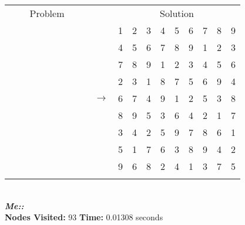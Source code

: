 \documentclass{article}
\begin{document}
\begin{tabular}{||c|c|c||c|c|c||c|c|c|| c ||c|c|c||c|c|c||c|c|c||}
  \cmidrule{1-9} \cmidrule{11-19}
  \multicolumn{9}{|c|}{Problem} &                   & \multicolumn{9}{|c|}{Solution}   \\\cmidrule{1-9} \cmidrule{11-19} \morecmidrules \cmidrule{1-9} \cmidrule{11-19}
  &   &   &   &   &   &   &   &   &  & 1 & 2 & 3 & 4 & 5 & 6 & 7 & 8 & 9\\\cmidrule{1-9} \cmidrule{11-19}
  &   &   &   &   &   &   &   &   &  & 4 & 5 & 6 & 7 & 8 & 9 & 1 & 2 & 3\\\cmidrule{1-9} \cmidrule{11-19}
  &   &   &   &   &   &   &   &   &  & 7 & 8 & 9 & 1 & 2 & 3 & 4 & 5 & 6\\\cmidrule{1-9} \cmidrule{11-19} \morecmidrules \cmidrule{1-9} \cmidrule{11-19}
  &   &   &   &   &   &   &   &   &  & 2 & 3 & 1 & 8 & 7 & 5 & 6 & 9 & 4\\\cmidrule{1-9} \cmidrule{11-19}
  &   &   &   &   &   &   &   &   & $\rightarrow$ & 6 & 7 & 4 & 9 & 1 & 2 & 5 & 3 & 8\\\cmidrule{1-9} \cmidrule{11-19}
  &   &   &   &   &   &   &   &   &  & 8 & 9 & 5 & 3 & 6 & 4 & 2 & 1 & 7\\\cmidrule{1-9} \cmidrule{11-19} \morecmidrules \cmidrule{1-9} \cmidrule{11-19}
  &   &   &   &   &   &   &   &   &  & 3 & 4 & 2 & 5 & 9 & 7 & 8 & 6 & 1\\\cmidrule{1-9} \cmidrule{11-19}
  &   &   &   &   &   &   &   &   &  & 5 & 1 & 7 & 6 & 3 & 8 & 9 & 4 & 2\\\cmidrule{1-9} \cmidrule{11-19}
  &   &   &   &   &   &   &   &   &  & 9 & 6 & 8 & 2 & 4 & 1 & 3 & 7 & 5\\\cmidrule{1-9} \cmidrule{11-19} \morecmidrules \cmidrule{1-9} \cmidrule{11-19}
\end{tabular}
\\
\small\emph{\textbf{Me::}}\\ \textbf{Nodes Visited:} 93 \textbf{Time:} 0.01308 seconds\\
\end{document}
